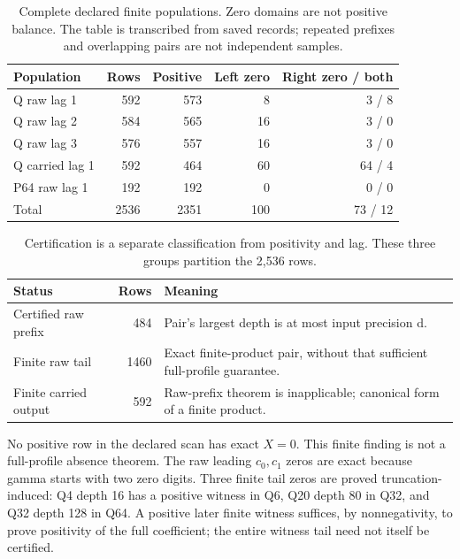 \documentclass[11pt,a4paper]{article}
\begin{document}
\begin{table}[ht]
\centering\small
\begin{tabular}{@{}lrrrr@{}}\toprule
Population & Rows & Positive & Left zero & Right zero / both\\\midrule
Q raw lag 1 & 592 & 573 & 8 & 3 / 8\\
Q raw lag 2 & 584 & 565 & 16 & 3 / 0\\
Q raw lag 3 & 576 & 557 & 16 & 3 / 0\\
Q carried lag 1 & 592 & 464 & 60 & 64 / 4\\
P64 raw lag 1 & 192 & 192 & 0 & 0 / 0\\\midrule
Total & 2536 & 2351 & 100 & 73 / 12\\\bottomrule
\end{tabular}
\caption{Complete declared finite populations. Zero domains are not positive balance. The table is transcribed from saved records; repeated prefixes and overlapping pairs are not independent samples.}
\label{tab:populations}
\end{table}

\begin{table}[ht]
\centering\small
\begin{tabular}{@{}lrp{.54\linewidth}@{}}\toprule
Status & Rows & Meaning\\\midrule
Certified raw prefix & 484 & Pair's largest depth is at most input precision d.\\
Finite raw tail & 1460 & Exact finite-product pair, without that sufficient full-profile guarantee.\\
Finite carried output & 592 & Raw-prefix theorem is inapplicable; canonical form of a finite product.\\\bottomrule
\end{tabular}
\caption{Certification is a separate classification from positivity and lag. These three groups partition the 2,536 rows.}
\label{tab:status}
\end{table}

No positive row in the declared scan has exact $X=0$. This finite finding is not a full-profile absence theorem. The raw leading $c_0,c_1$ zeros are exact because gamma starts with two zero digits. Three finite tail zeros are proved truncation-induced: Q4 depth 16 has a positive witness in Q6, Q20 depth 80 in Q32, and Q32 depth 128 in Q64. A positive later finite witness suffices, by nonnegativity, to prove positivity of the full coefficient; the entire witness tail need not itself be certified.
\end{document}
